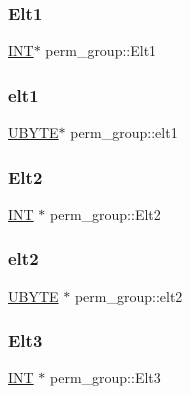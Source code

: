 \subsubsection{\texorpdfstring{Elt1}{Elt1}}
{\footnotesize\ttfamily \mbox{\hyperlink{galois_8h_a09fddde158a3a20bd2dcadb609de11dc}{I\+NT}}$\ast$ perm\+\_\+group\+::\+Elt1}

\mbox{\label{classperm__group_a455e711e3528d6b2e6e669ca0a006cc9}} 
\subsubsection{\texorpdfstring{elt1}{elt1}}
{\footnotesize\ttfamily \mbox{\hyperlink{galois_8h_a122c4acf389c050379f00341fdcd5812}{U\+B\+Y\+TE}}$\ast$ perm\+\_\+group\+::elt1}

\mbox{\label{classperm__group_a3e6f932c12a762619cb5967a36dba904}} 
\subsubsection{\texorpdfstring{Elt2}{Elt2}}
{\footnotesize\ttfamily \mbox{\hyperlink{galois_8h_a09fddde158a3a20bd2dcadb609de11dc}{I\+NT}} $\ast$ perm\+\_\+group\+::\+Elt2}

\mbox{\label{classperm__group_a5ecd834570a31f7e23a6dfa00ed469cf}} 
\subsubsection{\texorpdfstring{elt2}{elt2}}
{\footnotesize\ttfamily \mbox{\hyperlink{galois_8h_a122c4acf389c050379f00341fdcd5812}{U\+B\+Y\+TE}} $\ast$ perm\+\_\+group\+::elt2}

\mbox{\label{classperm__group_ab0fa3c449a63db50aacc24ddb7f601be}} 
\subsubsection{\texorpdfstring{Elt3}{Elt3}}
{\footnotesize\ttfamily \mbox{\hyperlink{galois_8h_a09fddde158a3a20bd2dcadb609de11dc}{I\+NT}} $\ast$ perm\+\_\+group\+::\+Elt3}

